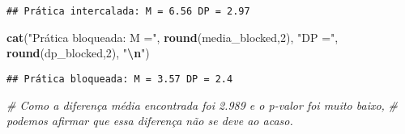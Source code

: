 \documentclass[
]{article}
\newenvironment{Shaded}{\begin{snugshade}}{\end{snugshade}}
\newcommand{\AttributeTok}[1]{\textcolor[rgb]{0.13,0.29,0.53}{#1}}
\newcommand{\CommentTok}[1]{\textcolor[rgb]{0.56,0.35,0.01}{\textit{#1}}}
\newcommand{\ConstantTok}[1]{\textcolor[rgb]{0.56,0.35,0.01}{#1}}
\newcommand{\DecValTok}[1]{\textcolor[rgb]{0.00,0.00,0.81}{#1}}
\newcommand{\FunctionTok}[1]{\textcolor[rgb]{0.13,0.29,0.53}{\textbf{#1}}}
\newcommand{\NormalTok}[1]{#1}
\newcommand{\OtherTok}[1]{\textcolor[rgb]{0.56,0.35,0.01}{#1}}
\newcommand{\SpecialCharTok}[1]{\textcolor[rgb]{0.81,0.36,0.00}{\textbf{#1}}}
\newcommand{\StringTok}[1]{\textcolor[rgb]{0.31,0.60,0.02}{#1}}
\begin{document}
\begin{Shaded}
\end{Shaded}

\begin{verbatim}
## Prática intercalada: M = 6.56 DP = 2.97
\end{verbatim}

\begin{Shaded}
\begin{Highlighting}[]
\FunctionTok{cat}\NormalTok{(}\StringTok{"Prática bloqueada: M ="}\NormalTok{, }\FunctionTok{round}\NormalTok{(media\_blocked,}\DecValTok{2}\NormalTok{), }\StringTok{"DP ="}\NormalTok{,}
    \FunctionTok{round}\NormalTok{(dp\_blocked,}\DecValTok{2}\NormalTok{), }\StringTok{"}\SpecialCharTok{\textbackslash{}n}\StringTok{"}\NormalTok{)}
\end{Highlighting}
\end{Shaded}

\begin{verbatim}
## Prática bloqueada: M = 3.57 DP = 2.4
\end{verbatim}

\begin{Shaded}
\begin{Highlighting}[]
\CommentTok{\# Como a diferença média encontrada foi 2.989 e o p{-}valor foi muito baixo,}
\CommentTok{\# podemos afirmar que essa diferença não se deve ao acaso.}
\end{Highlighting}
\end{Shaded}
\end{document}
